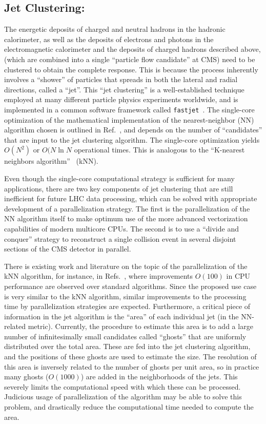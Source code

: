 \documentclass[12pt]{article}
\begin{document}
 

\subsection{Jet Clustering:} 




The energetic deposits of charged and neutral hadrons in the hadronic
calorimeter, as well as the deposits of electrons and photons in the
electromagnetic calorimeter and the deposits of charged hadrons
described above, (which are combined into a single ``particle flow
candidate'' at CMS) need to be clustered to obtain the complete
response. This is because the process inherently involves a ``shower''
of particles that spreads in both the lateral and radial directions,
called a ``jet''. This ``jet clustering'' is a well-established
technique employed at
many different particle physics experiments worldwide, and is
implemented in a common software framework called 
{\tt fastjet}~\cite{fastjet_manual}. The single-core optimization of
the mathematical implementation of the nearest-neighbor (NN) algorithm
chosen is outlined in Ref.~\cite{fastjet_timing}, and depends on the
number of ``candidates'' that are input to the jet clustering
algorithm. The single-core optimization yields $O(N^2)$ or 
$O(N \ln{N}$ operational times. This is analogous to the
``K-nearest neighbors algorithm''~\cite{knn_ieee} (kNN). 

Even though the single-core computational strategy is
sufficient for many applications, there are two key components of 
jet clustering that are still inefficient for future LHC data
processing, which can be solved with appropriate development of a
parallelization strategy. The first is the
parallelization of the NN algorithm itself to make
optimum use of the more advanced vectorization capabilities of modern
multicore CPUs. The second is to use a ``divide and conquer'' strategy
to reconstruct a single collision event in several disjoint sections of
the CMS detector in parallel. 

There is existing work and literature on the topic of the
parallelization of the kNN algorithm, for instance, in
Refs.~\cite{knn_gpu_1, knn_gpu_2, knn_gpu_3}, where improvements
$O(100)$ in CPU performance are observed over standard
algorithms. Since the proposed use case is
very similar to the kNN algorithm, similar improvements to the
processing time by parallelization strategies are expected. 
Furthermore, 
a critical piece of information in the jet algorithm
is the ``area'' of each individual jet (in the NN-related
metric). Currently, the procedure to estimate this area is to add a
large number of infinitesimally small candidates called ``ghosts''
that are uniformly distributed over the total area. These are fed into
the jet clustering algorithm, and the positions of these ghosts are
used to estimate the size. The resolution of this area is inversely
related to the number of ghosts per unit area, so in practice many
ghosts ($O(1000)$) are added in the neighborhoods of the jets. 
This severely limits the computational speed with which these can be
processed. Judicious usage of parallelization of the algorithm may be
able to solve this problem, and drastically reduce the computational
time needed to compute the area. 
\end{document}
